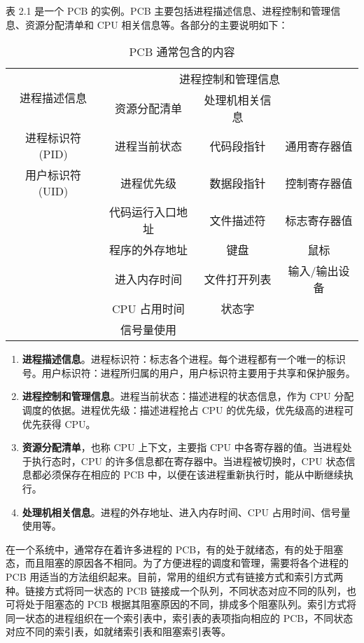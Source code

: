 \documentclass{ctexbook}
\begin{document}
	表 2.1 是一个 PCB 的实例。PCB 主要包括进程描述信息、进程控制和管理信息、资源分配清单和 CPU 相关信息等。各部分的主要说明如下：
	
	\begin{table}[h]
		\centering
		\caption{PCB 通常包含的内容}
		\label{tab:pcb}
		\begin{tabular}{|c|c|c|c|}
			\hline
			\multicolumn{1}{|c|}{\multirow{2}{*}{进程描述信息}} & \multicolumn{3}{c|}{进程控制和管理信息} \\
			\cline{2-4}
			& 资源分配清单 & 处理机相关信息 & \\
			\hline
			进程标识符 (PID) & 进程当前状态 & 代码段指针 & 通用寄存器值 \\
			用户标识符 (UID) & 进程优先级 & 数据段指针 & 控制寄存器值 \\
			\hline
			& 代码运行入口地址 & 文件描述符 & 标志寄存器值 \\
			\hline
			& 程序的外存地址 & 键盘 & 鼠标 \\
			\hline
			& 进入内存时间 & 文件打开列表 & 输入/输出设备 \\
			\hline
			& CPU 占用时间 & 状态字 & \\
			\hline
			& 信号量使用 & & \\
			\hline
		\end{tabular}
	\end{table}
	
	\begin{enumerate}
		\item \textbf{进程描述信息}。进程标识符：标志各个进程。每个进程都有一个唯一的标识号。用户标识符：进程所归属的用户，用户标识符主要用于共享和保护服务。
		\item \textbf{进程控制和管理信息}。进程当前状态：描述进程的状态信息，作为 CPU 分配调度的依据。进程优先级：描述进程抢占 CPU 的优先级，优先级高的进程可优先获得 CPU。
		\item \textbf{资源分配清单}，也称 CPU 上下文，主要指 CPU 中各寄存器的值。当进程处于执行态时，CPU 的许多信息都在寄存器中。当进程被切换时，CPU 状态信息都必须保存在相应的 PCB 中，以便在该进程重新执行时，能从中断继续执行。
		\item \textbf{处理机相关信息}。进程的外存地址、进入内存时间、CPU 占用时间、信号量使用等。
	\end{enumerate}
	
	在一个系统中，通常存在着许多进程的 PCB，有的处于就绪态，有的处于阻塞态，而且阻塞的原因各不相同。为了方便进程的调度和管理，需要将各个进程的 PCB 用适当的方法组织起来。目前，常用的组织方式有链接方式和索引方式两种。链接方式将同一状态的 PCB 链接成一个队列，不同状态对应不同的队列，也可将处于阻塞态的 PCB 根据其阻塞原因的不同，排成多个阻塞队列。索引方式将同一状态的进程组织在一个索引表中，索引表的表项指向相应的 PCB，不同状态对应不同的索引表，如就绪索引表和阻塞索引表等。
	
\end{document}
